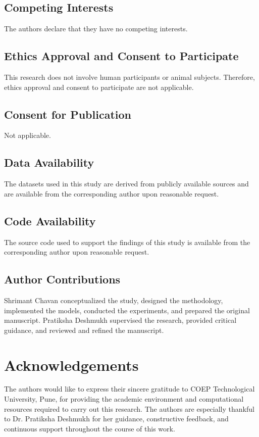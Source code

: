 \documentclass[sn-nature]{sn-jnl}
\begin{document}
\subsection*{Competing Interests}
The authors declare that they have no competing interests.

\subsection*{Ethics Approval and Consent to Participate}
This research does not involve human participants or animal subjects. Therefore, ethics approval and consent to participate are not applicable.

\subsection*{Consent for Publication}
Not applicable.

\subsection*{Data Availability}
The datasets used in this study are derived from publicly available sources and are available from the corresponding author upon reasonable request.

\subsection*{Code Availability}
The source code used to support the findings of this study is available from the corresponding author upon reasonable request.

\subsection*{Author Contributions}
Shrimant Chavan conceptualized the study, designed the methodology, implemented the models, conducted the experiments, and prepared the original manuscript.
Pratiksha Deshmukh supervised the research, provided critical guidance, and reviewed and refined the manuscript.

\section*{Acknowledgements}
The authors would like to express their sincere gratitude to COEP Technological University, Pune, for providing the academic environment and computational resources required to carry out this research. The authors are especially thankful to Dr. Pratiksha Deshmukh for her guidance, constructive feedback, and continuous support throughout the course of this work.


\end{document}
